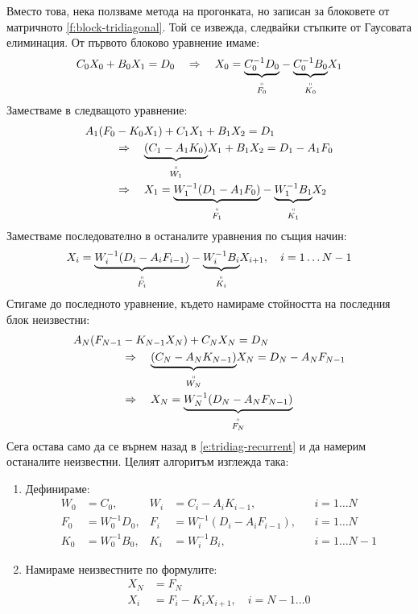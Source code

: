 \documentclass[12pt]{article}
\numberwithin{equation}{section}
\newcommand{\DefineAs}[2]{\underset{\overset{\shortparallel}{#2}}{\underbrace{#1}}}
\begin{document}
Вместо това, нека ползваме метода на прогонката, но записан за блоковете от матричното \autoref{f:block-tridiagonal}. Той се извежда, следвайки стъпките от Гаусовата елиминация. От първото блоково уравнение имаме:
\begin{equation}
    C_0 X_0 + B_0 X_1 = D_0
    \quad\Rightarrow\quad
    X_0 = \DefineAs{C_0^{-1}D_0}{F_0} - \DefineAs{C_0^{-1}B_0}{K_0} X_1
\end{equation}
Заместваме в следващото уравнение:
\begin{equation}
    \begin{aligned}
        A_1(F_0 &- K_0 X_1) + C_1 X_1 + B_1 X_2 = D_1 \\
        &\Rightarrow\quad \DefineAs{(C_1 - A_1 K_0)}{W_1}X_1 + B_1 X_2 = D_1 - A_1 F_0 \\
        &\Rightarrow\quad X_1 = \DefineAs{W_1^{-1}(D_1 - A_1 F_0)}{F_1} - \DefineAs{W_1^{-1}B_1}{K_1} X_2
    \end{aligned}
\end{equation}
Заместваме последователно в останалите уравнения по същия начин:
\begin{equation}
    \label{e:tridiag-recurrent}
    X_i = \DefineAs{W_i^{-1}(D_i - A_i F_{i-1})}{F_i} - \DefineAs{W_i^{-1}B_i}{K_i} X_{i+1}, \quad i=1\dots N-1
\end{equation}
Стигаме до последното уравнение, където намираме стойността на последния блок неизвестни:
\begin{equation}
    \begin{aligned}
        A_N(F_{N-1} &- K_{N-1}X_N) + C_N X_N = D_N \\
        &\Rightarrow\quad \DefineAs{(C_N - A_N K_{N-1})}{W_N}X_N = D_N - A_N F_{N-1} \\
        &\Rightarrow\quad X_N = \DefineAs{W_N^{-1}(D_N - A_N F_{N-1})}{F_N}
    \end{aligned}
\end{equation}
Сега остава само да се върнем назад в \autoref{e:tridiag-recurrent} и да намерим останалите неизвестни. Целият алгоритъм изглежда така:

\begin{enumerate}
    \item Дефинираме:
        \begin{align*}
            W_0 &= C_0, & W_i &= C_i - A_i K_{i-1}, &&i=1\dots N \\
            F_0 &= W_0^{-1} D_0, & F_i &= W_i^{-1}(D_i - A_i F_{i-1}), &&i=1\dots N \\
            K_0 &= W_0^{-1} B_0, & K_i &= W_i^{-1} B_i, &&i=1\dots N-1
        \end{align*}
    \item Намираме неизвестните по формулите:
        \begin{align*}
            X_N &= F_N \\
            X_i &= F_i - K_i X_{i+1}, \quad i=N-1 \dots 0
        \end{align*}
\end{enumerate}
\end{document}

